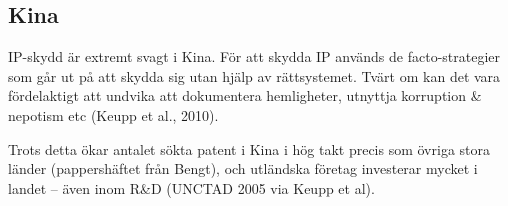 \subsection{Kina}

IP-skydd är extremt svagt i Kina. För att skydda IP används de facto-strategier som går ut på att skydda sig utan hjälp av rättsystemet. Tvärt om kan det vara fördelaktigt att undvika att dokumentera hemligheter, utnyttja korruption \& nepotism etc (Keupp et al., 2010).

Trots detta ökar antalet sökta patent i Kina i hög takt precis som övriga stora länder (pappershäftet från Bengt), och utländska företag investerar mycket i landet -- även inom R\&D (UNCTAD 2005 via Keupp et al).
